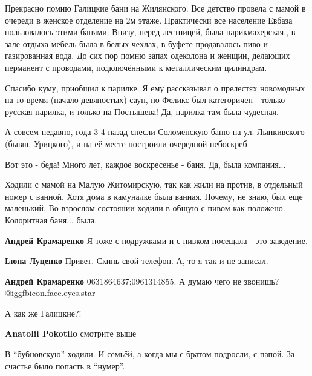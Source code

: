 \begin{itemize}

Прекрасно помню Галицкие бани на Жилянского. Все детство провела с мамой в
очереди в женское отделение на 2м этаже. Практически все население Евбаза
пользовалось этими банями. Внизу, перед лестницей, была парикмахерская., в зале
отдыха мебель была в белых чехлах, в буфете продавалось пиво и газированная
вода. До сих пор помню запах одеколона и женщин, делающих перманент с
проводами, подключёнными к металлическим цилиндрам.


Спасибо куму, приобщил к парилке. Я ему рассказывал о прелестях новомодных на
то время (начало девяностых) саун, но Феликс был категоричен - только русская
парилка, и только на Постышева! Да, парилка там была чудесная.


А совсем недавно, года 3-4 назад снесли Соломенскую баню на ул. Лыпкивского
(бывш. Урицкого), и на её месте построили очередной небоскреб

\begin{itemize} %
Вот это - беда! Много лет, каждое воскресенье - баня. Да, была компания...
\end{itemize} %


Ходили с мамой на Малую Житомирскую, так как жили на против, в отдельный номер
с ванной. Хотя дома в камуналке была ванная. Почему, не знаю, был еще
маленький. Во взрослом состоянии ходили в общую с пивом как положено.
Колоритная баня... была.

\begin{itemize} %
\textbf{Андрей Крамаренко} Я тоже с подружками и с пивком посещала - это заведение.

\textbf{Ілона Луценко} Привет. Скинь свой телефон. А, то я так и не записал.

\textbf{Андрей Крамаренко} 0631864637;0961314855. А думаю чего не звонишь? @igg{fbicon.face.eyes.star} 
\end{itemize} %

А как же Галицкие?!

\textbf{Anatolii Pokotilo} смотрите выше

В \enquote{бубновскую} ходили. И семьёй, а когда мы с братом подросли, с папой.
За счастье было попасть в \enquote{нумер}.


\end{itemize}
